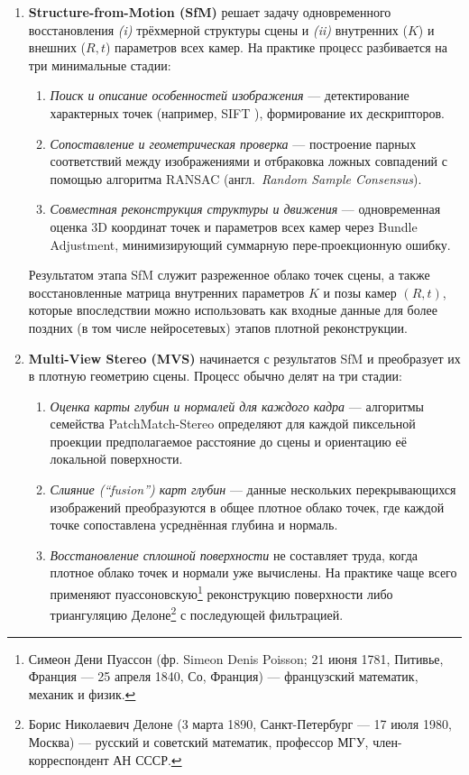 \begin{enumerate}
  \item \textbf{Structure-from-Motion (SfM)} решает задачу одновременного восстановления \emph{(i)} трёхмерной структуры
  сцены и \emph{(ii)} внутренних ($K$) и внешних ($R,t$) параметров всех камер.
  На практике процесс разбивается на три минимальные стадии:

  \begin{enumerate}
    \item \emph{Поиск и описание особенностей изображения} — детектирование
    характерных точек (например, \textsc{SIFT} \cite{lowe2004distinctiveimagefeatures}), формирование их дескрипторов.
    \item \emph{Сопоставление и геометрическая проверка} — построение парных
    соответствий между изображениями и отбраковка ложных совпадений с помощью
    алгоритма RANSAC (англ.\ \emph{Random Sample Consensus}).
    \item \emph{Совместная реконструкция структуры и движения} —
     одновременная оценка 3D координат точек и параметров всех камер через
     Bundle Adjustment, минимизирующий суммарную пере‑проекционную ошибку.
  \end{enumerate}

  Результатом этапа SfM служит разреженное облако точек сцены, а также
  восстановленные матрица внутренних параметров $K$ и позы камер $(R,t)$,
  которые впоследствии можно использовать как входные данные для более поздних
  (в том числе нейросетевых) этапов плотной реконструкции.

  \item \textbf{Multi-View Stereo (MVS)} начинается с результатов SfM и
  преобразует их в плотную геометрию сцены. Процесс обычно делят на три
  стадии:

  \begin{enumerate}
    \item \emph{Оценка карты глубин и нормалей для каждого кадра} — алгоритмы
    семейства PatchMatch-Stereo определяют для каждой пиксельной проекции
    предполагаемое расстояние до сцены и ориентацию её локальной поверхности.
    \item \emph{Слияние (``fusion'') карт глубин} — данные нескольких
    перекрывающихся изображений преобразуются в общее плотное облако точек, где
    каждой точке сопоставлена усреднённая глубина и нормаль.
    \item \emph{Восстановление сплошной поверхности} не составляет труда, когда
    плотное облако точек и нормали уже вычислены. На практике чаще всего
    применяют пуассоновскую\footnote{Симеон Дени Пуассон (фр. Simeon Denis
    Poisson; 21 июня 1781, Питивье, Франция — 25 апреля 1840, Со, Франция) —
    французский математик, механик и физик.} реконструкцию поверхности
    \cite{10.1145/2487228.2487237} либо триангуляцию Делоне\footnote{Борис
    Николаевич Делоне (3 марта 1890, Санкт-Петербург — 17 июля 1980,
    Москва) — русский и советский математик, профессор МГУ, член-корреспондент
    АН СССР.} с последующей фильтрацией.
  \end{enumerate}


\end{enumerate}
